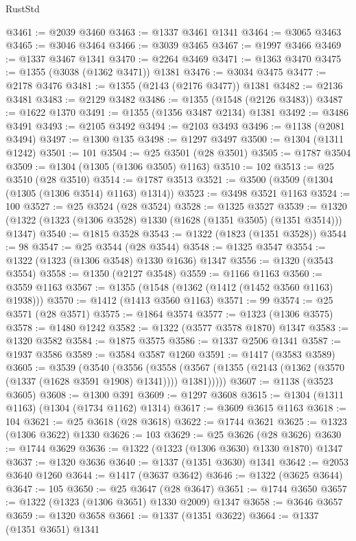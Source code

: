 \begin{lexlean}{RustStd}
\begin{coremodule}
@3461 := @2039 @3460
@3463 := @1337 @3461 @1341
@3464 := @3065 @3463
@3465 := @3046 @3464
@3466 := @3039 @3465
@3467 := @1997 @3466
@3469 := @1337 @3467 @1341
@3470 := @2264 @3469
@3471 := @1363 @3470
@3475 := @1355 (@3038 (@1362 @3471)) @1381
@3476 := @3034 @3475
@3477 := @2178 @3476
@3481 := @1355 (@2143 (@2176 @3477)) @1381
@3482 := @2136 @3481
@3483 := @2129 @3482
@3486 := @1355 (@1548 (@2126 @3483))
@3487 := @1622 @1370
@3491 := @1355 (@1356 @3487 @2134) @1381
@3492 := @3486 @3491
@3493 := @2105 @3492
@3494 := @2103 @3493
@3496 := @1138 (@2081 @3494)
@3497 := @1300 @135
@3498 := @1297 @3497
@3500 := @1304 (@1311 @1242)
@3501 := 101
@3504 := @25 @3501 (@28 @3501)
@3505 := @1787 @3504
@3509 := @1304 (@1305 (@1306 @3505) @1163)
@3510 := 102
@3513 := @25 @3510 (@28 @3510)
@3514 := @1787 @3513
@3521 := @3500 (@3509 (@1304 (@1305 (@1306 @3514) @1163) @1314))
@3523 := @3498 @3521 @1163
@3524 := 100
@3527 := @25 @3524 (@28 @3524)
@3528 := @1325 @3527
@3539 := @1320 (@1322 (@1323 (@1306 @3528) @1330 (@1628 (@1351 @3505) (@1351 @3514))) @1347)
@3540 := @1815 @3528
@3543 := @1322 (@1823 (@1351 @3528))
@3544 := 98
@3547 := @25 @3544 (@28 @3544)
@3548 := @1325 @3547
@3554 := @1322 (@1323 (@1306 @3548) @1330 @1636) @1347
@3556 := @1320 (@3543 @3554)
@3558 := @1350 (@2127 @3548)
@3559 := @1166 @1163
@3560 := @3559 @1163
@3567 := @1355 (@1548 (@1362 (@1412 (@1452 @3560 @1163) @1938)))
@3570 := @1412 (@1413 @3560 @1163)
@3571 := 99
@3574 := @25 @3571 (@28 @3571)
@3575 := @1864 @3574
@3577 := @1323 (@1306 @3575)
@3578 := @1480 @1242
@3582 := @1322 (@3577 @3578 @1870) @1347
@3583 := @1320 @3582
@3584 := @1875 @3575
@3586 := @1337 @2506 @1341
@3587 := @1937 @3586
@3589 := @3584 @3587 @1260
@3591 := @1417 (@3583 @3589)
@3605 := @3539
    (@3540
      (@3556
        (@3558 (@3567 (@1355 (@2143 (@1362 (@3570 (@1337 (@1628 @3591 @1908) @1341)))) @1381)))))
@3607 := @1138 (@3523 @3605)
@3608 := @1300 @391
@3609 := @1297 @3608
@3615 := @1304 (@1311 @1163) (@1304 (@1734 @1162) @1314)
@3617 := @3609 @3615 @1163
@3618 := 104
@3621 := @25 @3618 (@28 @3618)
@3622 := @1744 @3621
@3625 := @1323 (@1306 @3622) @1330
@3626 := 103
@3629 := @25 @3626 (@28 @3626)
@3630 := @1744 @3629
@3636 := @1322 (@1323 (@1306 @3630) @1330 @1870) @1347
@3637 := @1320 @3636
@3640 := @1337 (@1351 @3630) @1341
@3642 := @2053 @3640 @1260
@3644 := @1417 (@3637 @3642)
@3646 := @1322 (@3625 @3644)
@3647 := 105
@3650 := @25 @3647 (@28 @3647)
@3651 := @1744 @3650
@3657 := @1322 (@1323 (@1306 @3651) @1330 @2009) @1347
@3658 := @3646 @3657
@3659 := @1320 @3658
@3661 := @1337 (@1351 @3622)
@3664 := @1337 (@1351 @3651) @1341

\end{coremodule}
\end{lexlean}
